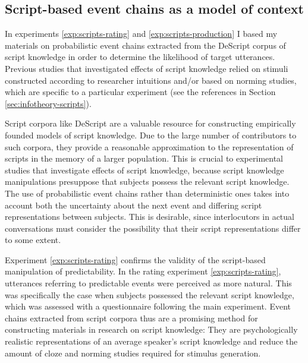 \subsection{Script-based event chains as a model of context}

In experiments \ref{exp:scripts-rating} and \ref{exp:scripts-production} I based my materials on probabilistic event chains extracted from the DeScript corpus of script knowledge \citep{wanzare.etal2016} in order to determine the likelihood of target utterances. Previous studies that investigated effects of script knowledge relied on stimuli constructed according to researcher intuitions and/or based on norming studies, which are specific to a particular experiment (see the references in Section \ref{sec:infotheory-scripts}).

Script corpora like DeScript \citep{wanzare.etal2016} are a valuable resource for constructing empirically founded models of script knowledge. Due to the large number of contributors to such corpora, they provide a reasonable approximation to the representation of scripts in the memory of a larger population. This is crucial to experimental studies that investigate effects of script knowledge, because script knowledge manipulations presuppose that subjects possess the relevant script knowledge. The use of probabilistic event chains rather than deterministic ones takes into account both the uncertainty about the next event and differing script representations between subjects. This is desirable, since interlocutors in actual conversations must consider the possibility that their script representations differ to some extent.

Experiment \ref{exp:scripts-rating} confirms the validity of the script-based manipulation of predictability. In the rating experiment \ref{exp:scripts-rating}, utterances referring to predictable events were perceived as more natural. This was specifically the case when subjects possessed the relevant script knowledge, which was assessed with a questionnaire following the main experiment. Event chains extracted from script corpora thus are a promising method for constructing materials in research on script knowledge: They are psychologically realistic representations of an average speaker's script knowledge and reduce the amount of cloze and norming studies required for stimulus generation.

